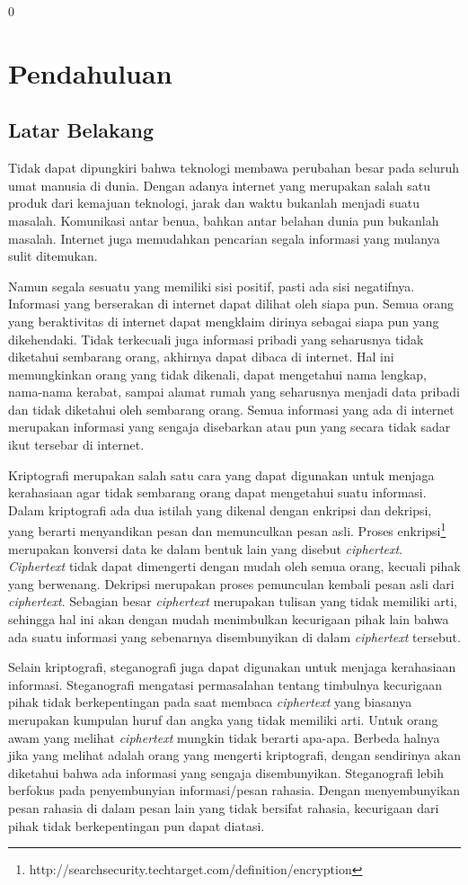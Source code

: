 0\chapter{Pendahuluan}
\label{chap:pendahuluan}

\section{Latar Belakang}
\label{sec:latarbelakang}

Tidak dapat dipungkiri bahwa teknologi membawa perubahan besar pada seluruh umat manusia di dunia. Dengan adanya internet yang merupakan salah satu produk dari kemajuan teknologi, jarak dan waktu bukanlah menjadi suatu masalah. Komunikasi antar benua, bahkan antar belahan dunia pun bukanlah masalah. Internet juga memudahkan pencarian segala informasi yang mulanya sulit ditemukan.

Namun segala sesuatu yang memiliki sisi positif, pasti ada sisi negatifnya. Informasi yang berserakan di internet dapat dilihat oleh siapa pun. Semua orang yang beraktivitas di internet dapat mengklaim dirinya sebagai siapa pun yang dikehendaki. Tidak terkecuali juga informasi pribadi yang seharusnya tidak diketahui sembarang orang, akhirnya dapat dibaca di internet. Hal ini memungkinkan orang yang tidak dikenali, dapat mengetahui nama lengkap, nama-nama kerabat, sampai alamat rumah yang seharusnya menjadi data pribadi dan tidak diketahui oleh sembarang orang. Semua informasi yang ada di internet merupakan informasi yang sengaja disebarkan atau pun yang secara tidak sadar ikut tersebar di internet.

Kriptografi merupakan salah satu cara yang dapat digunakan untuk menjaga kerahasiaan agar tidak sembarang orang dapat mengetahui suatu informasi. Dalam kriptografi ada dua istilah yang dikenal dengan enkripsi dan dekripsi, yang berarti menyandikan pesan dan memunculkan pesan asli. Proses enkripsi\footnote{http://searchsecurity.techtarget.com/definition/encryption} merupakan konversi data ke dalam bentuk lain yang disebut \textit{ciphertext}. \textit{Ciphertext} tidak dapat dimengerti dengan mudah oleh semua orang, kecuali pihak yang berwenang. Dekripsi merupakan proses pemunculan kembali pesan asli dari \textit{ciphertext}. Sebagian besar \textit{ciphertext} merupakan tulisan yang tidak memiliki arti, sehingga hal ini akan dengan mudah menimbulkan kecurigaan pihak lain bahwa ada suatu informasi yang sebenarnya disembunyikan di dalam \textit{ciphertext} tersebut.

Selain kriptografi, steganografi juga dapat digunakan untuk menjaga kerahasiaan informasi. Steganografi mengatasi permasalahan tentang timbulnya kecurigaan pihak tidak berkepentingan pada saat membaca \textit{ciphertext} yang biasanya merupakan kumpulan huruf dan angka yang tidak memiliki arti. Untuk orang awam yang melihat \textit{ciphertext} mungkin tidak berarti apa-apa. Berbeda halnya jika yang melihat adalah orang yang mengerti kriptografi, dengan sendirinya akan diketahui bahwa ada informasi yang sengaja disembunyikan. Steganografi lebih berfokus pada penyembunyian informasi/pesan rahasia. Dengan menyembunyikan pesan rahasia di dalam pesan lain yang tidak bersifat rahasia, kecurigaan dari pihak tidak berkepentingan pun dapat diatasi.


